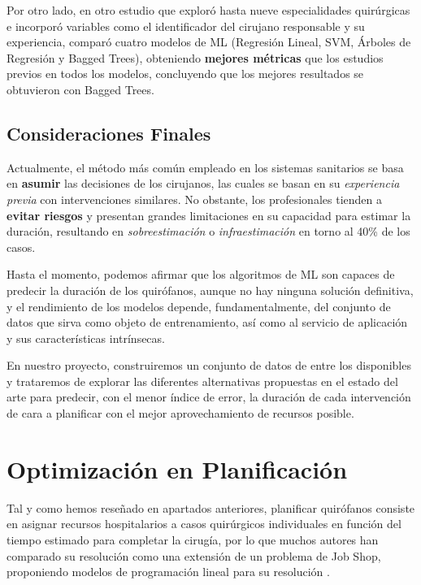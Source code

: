 Por otro lado, en otro estudio que exploró hasta nueve especialidades quirúrgicas \cite{Martinez2021MachinePrediction} e incorporó variables como el identificador del cirujano responsable y su experiencia, comparó cuatro modelos de ML (Regresión Lineal, SVM, Árboles de Regresión y Bagged Trees), obteniendo \textbf{mejores métricas} que los estudios previos en todos los modelos, concluyendo que los mejores resultados se obtuvieron con Bagged Trees.

\subsection{Consideraciones Finales}

Actualmente, el método más común empleado en los sistemas sanitarios se basa en \textbf{asumir} las decisiones de los cirujanos, las cuales se basan en su \textit{experiencia previa} con intervenciones similares. No obstante, los profesionales tienden a \textbf{evitar riesgos} y presentan grandes limitaciones en su capacidad para estimar la duración, resultando en \textit{sobreestimación} o \textit{infraestimación} en torno al 40\% de los casos\cite{Huang2022AutomaticNetworks}.

Hasta el momento, podemos afirmar que los algoritmos de ML son capaces de predecir la duración de los quirófanos, aunque no hay ninguna solución definitiva, y el rendimiento de los modelos depende, fundamentalmente, del conjunto de datos que sirva como objeto de entrenamiento, así como al servicio de aplicación y sus características intrínsecas.


En nuestro proyecto, construiremos un conjunto de datos de entre los disponibles y trataremos de explorar las diferentes alternativas propuestas en el estado del arte para predecir, con el menor índice de error, la duración de cada intervención de cara a planificar con el mejor aprovechamiento de recursos posible.

\newpage
\section{Optimización en Planificación}

Tal y como hemos reseñado en apartados anteriores, planificar quirófanos consiste en asignar recursos hospitalarios a casos quirúrgicos individuales en función del tiempo estimado para completar la cirugía, por lo que muchos autores han comparado su resolución como una extensión de un problema de Job Shop, proponiendo modelos de programación lineal para su resolución \cite{Pham2008SurgicalProblem} .

